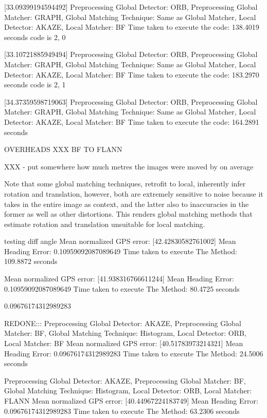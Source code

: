 [33.09399194594492]
Preprocessing Global Detector: ORB, Preprocessing Global Matcher: GRAPH, Global Matching Technique: Same as Global Matcher, Local Detector: AKAZE, Local Matcher: BF
Time taken to execute the code: 138.4019 seconds
code is 2, 0


[33.10721885949494]
Preprocessing Global Detector: ORB, Preprocessing Global Matcher: GRAPH, Global Matching Technique: Same as Global Matcher, Local Detector: AKAZE, Local Matcher: BF
Time taken to execute the code: 183.2970 seconds
code is 2, 1


[34.37359598719063]
Preprocessing Global Detector: ORB, Preprocessing Global Matcher: GRAPH, Global Matching Technique: Same as Global Matcher, Local Detector: AKAZE, Local Matcher: BF
Time taken to execute the code: 164.2891 seconds

OVERHEADS XXX BF TO FLANN

XXX - put somewhere how much metres the images were moved by on average


Note that some global matching techniques, retrofit to local, inherently infer rotation and translation, however, both are extremely sensitive to noise because it takes in the entire image as context, and the latter also to inaccuracies in the former as well as other distortions. This renders global matching methods that estimate rotation and translation unsuitable for local matching.  





testing diff angle 
Mean normalized GPS error: [42.42830582761002]
Mean Heading Error: 0.10959092087089649
Time taken to execute The Method: 109.8872 seconds

Mean normalized GPS error: [41.938316766611244]
Mean Heading Error: 0.10959092087089649
Time taken to execute The Method: 80.4725 seconds


0.09676174312989283 


REDONE:::
Preprocessing Global Detector: AKAZE, Preprocessing Global Matcher: BF, Global Matching Technique: Histogram, Local Detector: ORB, Local Matcher: BF
Mean normalized GPS error: [40.51783973214321]
Mean Heading Error: 0.09676174312989283
Time taken to execute The Method: 24.5006 seconds


Preprocessing Global Detector: AKAZE, Preprocessing Global Matcher: BF, Global Matching Technique: Histogram, Local Detector: ORB, Local Matcher: FLANN
Mean normalized GPS error: [40.44967224183749]
Mean Heading Error: 0.09676174312989283
Time taken to execute The Method: 63.2306 seconds


